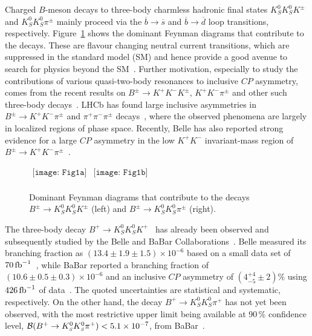 \documentclass[aps,prl,preprint,tightenlines,superscriptaddress,,amsmath,byrevtex]{revtex4}
\def\bbar   {\ensuremath{\overline b}\xspace}
\def\sbar   {\ensuremath{\overline s}\xspace}
\def\dbar   {\ensuremath{\overline d}\xspace}
\def\pip    {\ensuremath{\pi^+}\xspace}
\def\pipm   {\ensuremath{\pi^{\pm}}\xspace}
\def\Kp     {\ensuremath{K^+}\xspace}
\def\Km     {\ensuremath{K^-}\xspace}
\def\kpm    {\ensuremath{K^{\pm}}\xspace}
\def\KS     {\ensuremath{K^0_{\scriptscriptstyle S}}\xspace}
\def\Bu     {\ensuremath{B^+}\xspace}
\def\Bp     {\ensuremath{\Bu}\xspace}
\def\invfb{\ensuremath{\mbox{\,fb}^{-1}}\xspace}
\def\to{\ensuremath{\rightarrow}\xspace}
\def\CP {\ensuremath{C\!P}\xspace}
\begin{document}

\maketitle

\tighten
{\renewcommand{\thefootnote}{\fnsymbol{footnote}}}
\setcounter{footnote}{0}


Charged $B$-meson decays to three-body charmless hadronic 
final states $\KS\KS\kpm$ and $\KS\KS\pipm$ mainly proceed 
via the $\bbar\to\sbar$ and $\bbar\to\dbar$ loop transitions, respectively. Figure~\ref{fig:Fey} shows the
dominant Feynman diagrams that contribute to the decays. 
These are flavour changing neutral current transitions, 
which are suppressed in the standard model (SM) and hence 
provide a good avenue to search for physics beyond the 
SM~\cite{PAP:ref}. Further motivation, especially to study the contributions of various quasi-two-body 
resonances to  inclusive $\CP$ asymmetry, comes from the recent results on  $B^{\pm}\to\Kp\Km K^{\pm}$, $\Kp\Km \pi^{\pm}$ and other such three-body decays~\cite{LHCb:paper1,LHCb:paper2,Chialing:paper}. LHCb has found large inclusive asymmetries in $B^{\pm}\to\Kp\Km \pi^{\pm}$ and $\pi^+\pi^-\pi^{\pm}$ decays~\cite{LHCb:paper2}, where the observed phenomena are largely in localized regions of phase space. Recently, Belle has also reported strong evidence for a large $\CP$ asymmetry in the low $K^{+}K^{-}$ invariant-mass region of $B^{\pm}\to\Kp\Km \pi^{\pm}$~\cite{Chialing:paper}. 

\begin{figure}[!htb]
\begin{center}$
\begin{array}{cc}
\texttt{[image: Fig1a]} &
\texttt{[image: Fig1b]} \\
\end{array}$
\end{center}
\caption{Dominant Feynman diagrams that contribute to the
 decays $B^{\pm}\to\KS\KS\kpm$ (left) and $B^{\pm}\to\KS\KS\pipm$ (right).}
\label{fig:Fey}
\end{figure}
The three-body decay $\Bp\to\KS\KS\Kp$~\cite{charge:ref1} has already been observed 
and subsequently studied  by the Belle and BaBar Collaborations~\cite{Belle:paper1,BaBar:paper1,BaBar:paper2}. 
Belle measured its branching fraction as 
$(13.4\pm1.9\pm1.5)\times10^{-6}$ based on a small data set of $70\invfb$~\cite{Belle:paper1}, while BaBar reported a branching fraction of $(10.6\pm0.5\pm0.3)\times10^{-6}$ and an inclusive $\CP$ 
asymmetry of $(4_{-5}^{+4}\pm2)\%$ using $426\invfb$ of data~\cite{BaBar:paper1}. The quoted uncertainties are statistical and systematic, respectively. On the other hand, the decay $\Bp\to\KS\KS\pip$ has not yet been observed, with the most restrictive upper limit being available at 90\,\% confidence level, 
${\cal B}(\Bp\to\KS\KS\pip)<5.1\times 10^{-7}$, from BaBar~\cite{BaBar:paper2}.
\end{document}
